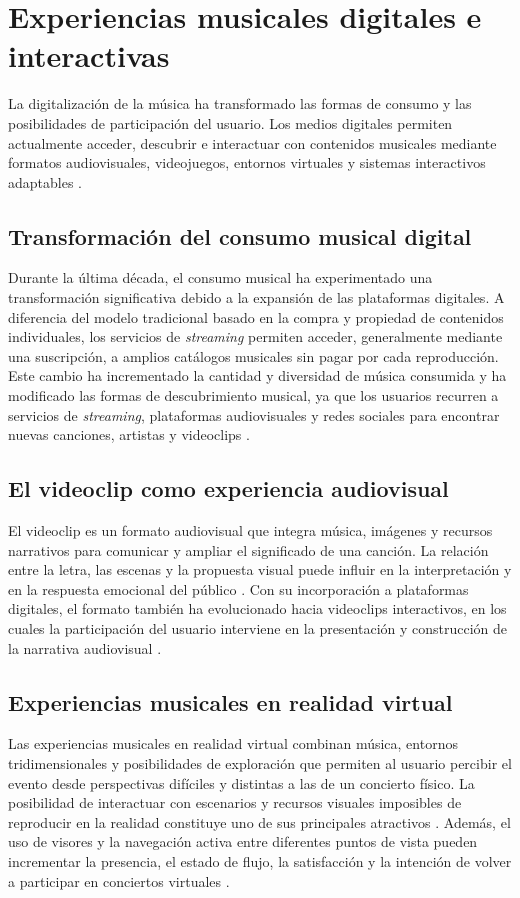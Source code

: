 %
\section{Experiencias musicales digitales e interactivas}
La digitalización de la música ha transformado las formas de consumo y las posibilidades de participación del usuario. Los medios digitales permiten actualmente acceder, descubrir e interactuar con contenidos musicales mediante formatos audiovisuales, videojuegos, entornos virtuales y sistemas interactivos adaptables \cite{Datta2018,barboza2015digital,onderdijk2023concert,yannakakis2011experience}.
\subsection{Transformación del consumo musical digital}
Durante la última década, el consumo musical ha experimentado una transformación significativa debido a la expansión de las plataformas digitales. A diferencia del modelo tradicional basado en la compra y propiedad de contenidos individuales, los servicios de \emph{streaming} permiten acceder, generalmente mediante una suscripción, a amplios catálogos musicales sin pagar por cada reproducción. Este cambio ha incrementado la cantidad y diversidad de música consumida y ha modificado las formas de descubrimiento musical, ya que los usuarios recurren a servicios de \emph{streaming}, plataformas audiovisuales y redes sociales para encontrar nuevas canciones, artistas y videoclips \cite{Datta2018}.
\subsection{El videoclip como experiencia audiovisual}
El videoclip es un formato audiovisual que integra música, imágenes y recursos narrativos para comunicar y ampliar el significado de una canción. La relación entre la letra, las escenas y la propuesta visual puede influir en la interpretación y en la respuesta emocional del público \cite{saiyidatul2024narrative}. Con su incorporación a plataformas digitales, el formato también ha evolucionado hacia videoclips interactivos, en los cuales la participación del usuario interviene en la presentación y construcción de la narrativa audiovisual \cite{barboza2015digital}.
\subsection{Experiencias musicales en realidad virtual}
Las experiencias musicales en realidad virtual combinan música, entornos tridimensionales y posibilidades de exploración que permiten al usuario percibir el evento desde perspectivas difíciles y distintas a las de un concierto físico. La posibilidad de interactuar con escenarios y recursos visuales imposibles de reproducir en la realidad constituye uno de sus principales atractivos \cite{onderdijk2023concert}. Además, el uso de visores y la navegación activa entre diferentes puntos de vista pueden incrementar la presencia, el estado de flujo, la satisfacción y la intención de volver a participar en conciertos virtuales \cite{lo2023immersive}.

